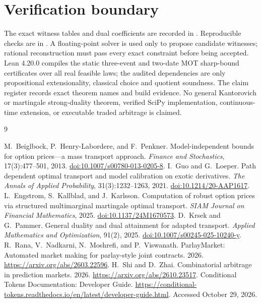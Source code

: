 \documentclass[11pt]{article}
\begin{document}
\section{Verification boundary}
The exact witness tables and dual coefficients are recorded in
. Reproducible checks are in
. A floating-point solver is used only
to propose candidate witnesses; rational reconstruction must pass every exact
constraint before being accepted. Lean 4.20.0 compiles the static three-event and two-date MOT sharp-bound
certificates over all real feasible laws; the audited dependencies are only
propositional extensionality, classical choice and quotient soundness.
The claim register records exact theorem names and build evidence. No general
Kantorovich or martingale strong-duality theorem, verified SciPy implementation,
continuous-time extension, or executable traded arbitrage is claimed.

\begin{thebibliography}{9}
\raggedright
{}
M.~Beiglbock, P.~Henry-Labordere, and F.~Penkner.
Model-independent bounds for option prices---a mass transport approach.
\emph{Finance and Stochastics}, 17(3):477--501, 2013.
\href{https://doi.org/10.1007/s00780-013-0205-8}{doi:10.1007/s00780-013-0205-8}.
I.~Guo and G.~Loeper.
Path dependent optimal transport and model calibration on exotic derivatives.
\emph{The Annals of Applied Probability}, 31(3):1232--1263, 2021.
\href{https://doi.org/10.1214/20-AAP1617}{doi:10.1214/20-AAP1617}.
L.~Engstrom, S.~Kallblad, and J.~Karlsson.
Computation of robust option prices via structured multimarginal martingale
optimal transport. \emph{SIAM Journal on Financial Mathematics}, 2025.
\href{https://doi.org/10.1137/24M1670573}{doi:10.1137/24M1670573}.
D.~Krsek and G.~Pammer.
General duality and dual attainment for adapted transport.
\emph{Applied Mathematics and Optimization}, 91(2), 2025.
\href{https://doi.org/10.1007/s00245-025-10240-y}{doi:10.1007/s00245-025-10240-y}.
R.~Rana, V.~Nadkarni, N.~Moshrefi, and P.~Viswanath.
ParlayMarket: Automated market making for parlay-style joint contracts.
2026. \url{https://arxiv.org/abs/2603.22596}.
H.~Shi and D.~Zhai.
Combinatorial arbitrage in prediction markets.
2026. \url{https://arxiv.org/abs/2610.23517}.
Conditional Tokens Documentation: Developer Guide.
\url{https://conditional-tokens.readthedocs.io/en/latest/developer-guide.html}.
Accessed October 29, 2026.
\end{thebibliography}
\end{document}
